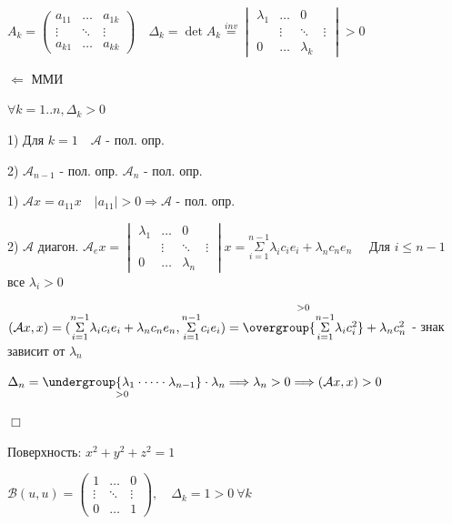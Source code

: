 \documentclass[12pt]{article}
\begin{document}
    $A_k = \begin{pmatrix}a_{11} & \dots & a_{1k} \\ \vdots & \ddots & \vdots \\ a_{k1} & \dots & a_{kk}\end{pmatrix} \quad
    \Delta_k = \det A_k \stackrel{inv}{=} \begin{vmatrix}\lambda_{1} & \dots & 0 \\ & \vdots & \ddots & \vdots \\ 0 & \dots & \lambda_{k}\end{vmatrix} > 0$

    $\Longleftarrow$ ММИ

    $\forall k = 1..n, \Delta_k > 0$

    1) Для $k = 1 \quad \mathcal{A}$ - пол. опр.

    2) $\mathcal{A}_{n-1}$ - пол. опр. \Longrightarrow $\mathcal{A}_n$ - пол. опр.

    1) $\mathcal{A}x = a_{11}x \quad |a_{11}| > 0 \Longrightarrow \mathcal{A}$ - пол. опр.

    2) $\mathcal{A}$ диагон. \quad $\mathcal{A}_e x =
    \begin{vmatrix}\lambda_{1} & \dots & 0 \\ & \vdots & \ddots & \vdots \\ 0 & \dots & \lambda_{n}\end{vmatrix}x =
    \overset{n - 1}{\underset{i = 1}{\Sigma}}\lambda_i c_i e_i + \lambda_n c_n e_n \quad$ Для $i \leq n - 1$ все $\lambda_i > 0$

    $(\mathcal{A}x, x) = (\overset{n - 1}{\underset{i = 1}{\Sigma}} \lambda_i c_i e_i + \lambda_n c_n e_n,
    \overset{n - 1}{\underset{i = 1}{\Sigma}} c_i e_i) = \overset{> 0}{\overgroup{\overset{n - 1}{\underset{i = 1}{\Sigma}} \lambda_i c_i^2}} + \lambda_n c_n^2$ - знак зависит от $\lambda_n$

    $\Delta_n = \underset{> 0}{\undergroup{\lambda_1 \cdot \dots \cdot \lambda_{n-1}}} \cdot \lambda_n
    \Longrightarrow \lambda_n > 0 \Longrightarrow (\mathcal{A}x, x) > 0$

    $\Box$

    \Ex Поверхность: $x^2 + y^2 + z^2 = 1$

    $\mathcal{B}(u, u) = \begin{pmatrix}1 & \dots & 0 \\ \vdots & \ddots & \vdots \\ 0 & \dots & 1\end{pmatrix},
    \quad \Delta_k = 1 > 0 \ \forall k$
\end{document}
